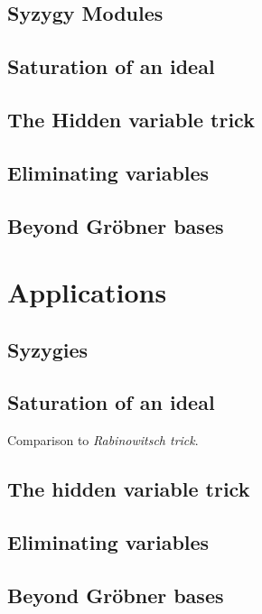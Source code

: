 \documentclass[11pt,a4paper]{article}
\begin{document}
\subsection{Syzygy Modules}




\subsection{Saturation of an ideal}
\subsection{The Hidden variable trick}
\subsection{Eliminating variables}
\subsection{Beyond Gröbner bases}

\section{Applications}
\subsection{Syzygies}
\subsection{Saturation of an ideal}
Comparison to \emph{Rabinowitsch trick}.
\subsection{The hidden variable trick}
\subsection{Eliminating variables}
\subsection{Beyond Gröbner bases}


{\small
}

 
\end{document}
